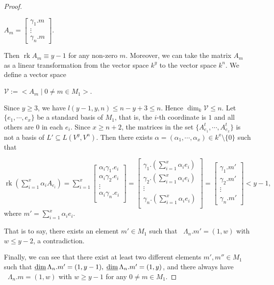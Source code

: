 \documentclass[a4paper,12pt]{amsart}
\newcommand{\cV}{\mathcal{V}}
\DeclareMathOperator{\rk}{rk}
\DeclareMathOperator{\dimu}{\underline{dim}}
\begin{document}
\begin{proof}
\begin{center}
$A_m=\begin{bmatrix}
\gamma_1.m\\
\vdots\\
\gamma_n.m
\end{bmatrix}.$
\end{center}
Then $\rk A_m\equiv y-1$ for any non-zero $m$. Moreover, we can take the matrix $A_m$ as a linear transformation from the vector space $k^y$ to the vector space $k^n$.  We define a vector space
\begin{center}
$\cV:=<A_m\mid 0\neq m\in M_1>$.
\end{center} 
Since $y\geq 3$, we have $l(y-1,y,n)\leq n-y+3\leq n$.  Hence $\dim_k \cV\leq n$.  Let $\{e_1,\cdots,e_{x}\}$ be a standard basis of $M_1$, that is,  the $i$-th coordinate is $1$ and all others are  $0$ in  each $e_i$. Since $x\geq n+2$,  the matrices in the set $\{A^t_{e_1},\cdots,A^t_{e_x}\}$ is not a basis of $L'\subseteq L(V^y, V^n)$. Then there exists $\alpha=(\alpha_1,\cdots,\alpha_x)\in k^{x}\setminus \{0\}$ such that
\begin{center}
$\rk (\sum^{x}_{i=1}\alpha_iA_{e_i})=\sum^x_{i=1}\begin{bmatrix}
\alpha_i\gamma_1.e_i\\
\alpha_i\gamma_2.e_i\\
\vdots\\
\alpha_i\gamma_n.e_i\\
\end{bmatrix} =\begin{bmatrix}\gamma_1.(\sum^x_{i=1}\alpha_ie_i) \\
\gamma_2.(\sum^x_{i=1}\alpha_ie_i) \\
\vdots \\
\gamma_n.(\sum^x_{i=1}\alpha_ie_i) \\
\end{bmatrix}=\begin{bmatrix}
\gamma_1.m'\\
\gamma_2.m'\\
\vdots\\
\gamma_n.m'
\end{bmatrix}<y-1,$ where $m'=\sum^x_{i=1}\alpha_ie_i$.
\end{center}
That is to say,  there exists an element $m'\in M_1$ such that $\dimu \Lambda_n.m'=(1,w)$ with $w\leq y-2$, a contradiction.


Finally, we can see that there exist at least two different elements   $m', m''\in M_1$ such that $ \dimu \Lambda_n.m'=(1,y-1), \hspace{0.1cm} \dimu \Lambda_n.m'=(1,y)$, and there always have $\dimu \Lambda_n.m =(1, w)$ with $w\geq  y-1$ for any $0\neq m\in M_1$.  



\end{proof}
\end{document}
